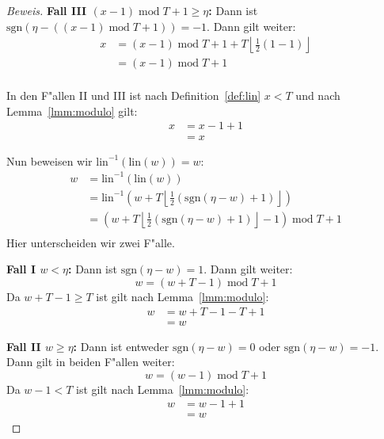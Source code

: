 \documentclass[a4paper]{article}
\newcommand*{\linf}{\mathrm{lin}}
\newcommand*{\sgn}{\mathrm{sgn}}
\renewcommand{\mod}{\;\mathrm{mod}\;}
\numberwithin{equation}{section}
\begin{document}
\begin{proof}[Beweis]
  \noindent\textbf{Fall III $(x - 1) \mod T + 1 \ge \eta$:} Dann ist
  $\sgn(\eta - ((x - 1) \mod T + 1)) = -1$. Dann gilt weiter:
  \begin{equation}
  \begin{split}
    x & = (x - 1) \mod T + 1 + T\left\lfloor\frac{1}{2} (1 - 1)\right\rfloor \\
    & = (x - 1) \mod T + 1 \\
  \end{split}
  \end{equation}

  \noindent In den F"allen II und III ist nach Definition~\ref{def:lin} $x < T$
  und nach Lemma~\ref{lmm:modulo} gilt:
  \begin{equation}
  \begin{split}
    x & = x - 1 + 1 \\
    & = x
  \end{split}
  \end{equation}

  \noindent Nun beweisen wir $\linf^{-1}(\linf(w)) = w$:
  \begin{equation}
  \begin{split}
    w & = \linf^{-1}(\linf(w)) \\
    & = \linf^{-1}(w + T\left\lfloor\frac{1}{2}
      (\sgn(\eta - w) + 1)\right\rfloor) \\
    & = (w + T\left\lfloor\frac{1}{2}
      (\sgn(\eta - w) + 1)\right\rfloor - 1) \mod T + 1 \\
  \end{split}
  \end{equation}
  Hier unterscheiden wir zwei F"alle.

  \noindent\textbf{Fall I $w < \eta$:} Dann ist $\sgn(\eta - w) = 1$. Dann gilt
  weiter:
  \begin{equation}w = (w + T - 1) \mod T + 1\end{equation}
  Da $w + T - 1 \ge T$ ist gilt nach Lemma~\ref{lmm:modulo}:
  \begin{equation}
  \begin{split}
    w & = w + T - 1 - T + 1 \\
    & = w
  \end{split}
  \end{equation}

  \noindent\textbf{Fall II $w \ge \eta$:} Dann ist entweder $\sgn(\eta - w) = 0$
  oder $\sgn(\eta - w) = -1$. Dann gilt in beiden F"allen weiter:
  \begin{equation}w = (w - 1) \mod T + 1\end{equation}
  Da $w - 1 < T$ ist gilt nach Lemma~\ref{lmm:modulo}:
  \begin{equation}
  \begin{split}
    w & = w - 1 + 1 \\
    & = w
  \end{split}
  \end{equation}
\end{proof}
\end{document}
